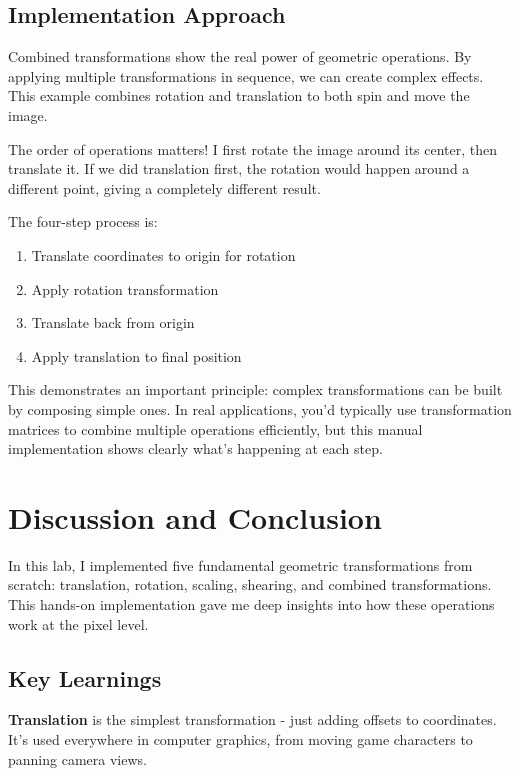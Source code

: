 \documentclass[12pt,a4paper]{report}
\begin{document}
\subsection{Implementation Approach}
Combined transformations show the real power of geometric operations. By applying multiple transformations in sequence, we can create complex effects. This example combines rotation and translation to both spin and move the image.

The order of operations matters! I first rotate the image around its center, then translate it. If we did translation first, the rotation would happen around a different point, giving a completely different result.

The four-step process is:
\begin{enumerate}
    \item Translate coordinates to origin for rotation
    \item Apply rotation transformation
    \item Translate back from origin
    \item Apply translation to final position
\end{enumerate}

This demonstrates an important principle: complex transformations can be built by composing simple ones. In real applications, you'd typically use transformation matrices to combine multiple operations efficiently, but this manual implementation shows clearly what's happening at each step.

\newpage
\section*{Discussion and Conclusion}

In this lab, I implemented five fundamental geometric transformations from scratch: translation, rotation, scaling, shearing, and combined transformations. This hands-on implementation gave me deep insights into how these operations work at the pixel level.

\subsection*{Key Learnings}

\textbf{Translation} is the simplest transformation - just adding offsets to coordinates. It's used everywhere in computer graphics, from moving game characters to panning camera views.
\end{document}
